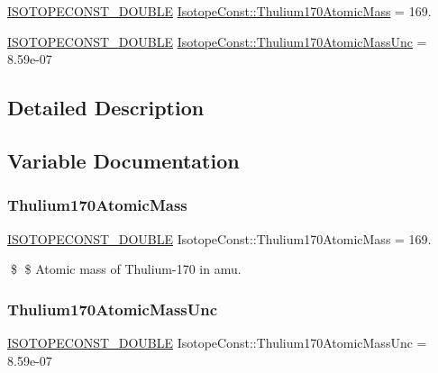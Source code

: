 \begin{DoxyCompactItemize}
\item 
\mbox{\hyperlink{group___isotope_const-_macros_ga8f45a7272ce02c0b4c65c44636ed719a}{I\+S\+O\+T\+O\+P\+E\+C\+O\+N\+S\+T\+\_\+\+D\+O\+U\+B\+LE}} \mbox{\hyperlink{group___isotope_const-_thulium-_tm170_gacc58770212265e7ef70dc6e5973b6761}{Isotope\+Const\+::\+Thulium170\+Atomic\+Mass}} = 169.
\item 
\mbox{\hyperlink{group___isotope_const-_macros_ga8f45a7272ce02c0b4c65c44636ed719a}{I\+S\+O\+T\+O\+P\+E\+C\+O\+N\+S\+T\+\_\+\+D\+O\+U\+B\+LE}} \mbox{\hyperlink{group___isotope_const-_thulium-_tm170_ga4551fc5f7fb63188c79946b5d8409b75}{Isotope\+Const\+::\+Thulium170\+Atomic\+Mass\+Unc}} = 8.\+59e-\/07
\end{DoxyCompactItemize}


\subsection{Detailed Description}


\subsection{Variable Documentation}
\mbox{\label{group___isotope_const-_thulium-_tm170_gacc58770212265e7ef70dc6e5973b6761}} 
\subsubsection{\texorpdfstring{Thulium170\+Atomic\+Mass}{Thulium170AtomicMass}}
{\footnotesize\ttfamily \mbox{\hyperlink{group___isotope_const-_macros_ga8f45a7272ce02c0b4c65c44636ed719a}{I\+S\+O\+T\+O\+P\+E\+C\+O\+N\+S\+T\+\_\+\+D\+O\+U\+B\+LE}} Isotope\+Const\+::\+Thulium170\+Atomic\+Mass = 169.}

\$ \$ Atomic mass of Thulium-\/170 in amu. \mbox{\label{group___isotope_const-_thulium-_tm170_ga4551fc5f7fb63188c79946b5d8409b75}} 
\subsubsection{\texorpdfstring{Thulium170\+Atomic\+Mass\+Unc}{Thulium170AtomicMassUnc}}
{\footnotesize\ttfamily \mbox{\hyperlink{group___isotope_const-_macros_ga8f45a7272ce02c0b4c65c44636ed719a}{I\+S\+O\+T\+O\+P\+E\+C\+O\+N\+S\+T\+\_\+\+D\+O\+U\+B\+LE}} Isotope\+Const\+::\+Thulium170\+Atomic\+Mass\+Unc = 8.\+59e-\/07}

